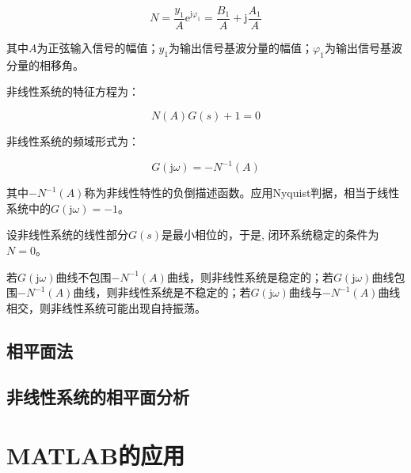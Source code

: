 \documentclass[cn, blue, normal, 12pt]{elegantnote}
\begin{document}
\begin{equation}
    N=\frac{y_1}{A}\mathrm{e}^{\mathrm{j}\varphi_1}=\frac{B_1}{A}+\mathrm{j}\frac{A_1}{A}
\end{equation}

其中$A$为正弦输入信号的幅值；$y_1$为输出信号基波分量的幅值；$\varphi_1$为输出信号基波分量的相移角。

非线性系统的特征方程为：

\begin{equation}
    N(A)G(s)+1=0
\end{equation}

非线性系统的频域形式为：

\begin{equation}
    G(\mathrm{j}\omega)=-N^{-1}(A)
\end{equation}

其中$-N^{-1}(A)$称为非线性特性的负倒描述函数。应用Nyquist判据，相当于线性系统中的$G(\mathrm{j}\omega)=-1$。

设非线性系统的线性部分$G(s)$是最小相位的，于是, 闭环系统稳定的条件为$N=0$。

若$G(\mathrm{j}\omega)$曲线不包围$-N^{-1}(A)$曲线，则非线性系统是稳定的；若$G(\mathrm{j}\omega)$曲线包围$-N^{-1}(A)$曲线，则非线性系统是不稳定的；若$G(\mathrm{j}\omega)$曲线与$-N^{-1}(A)$曲线相交，则非线性系统可能出现自持振荡。

\subsection{相平面法}



\subsection{非线性系统的相平面分析}



\section{MATLAB的应用}
\end{document}
